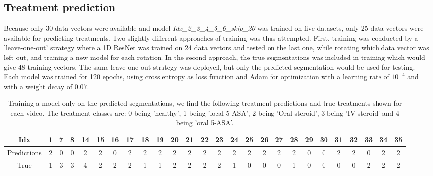 \subsection{Treatment prediction}
Because only 30 data vectors were available and model \textit{Idx\_2\_3\_4\_5\_6\_skip\_20} was trained on five datasets, only 25 data vectors were available for predicting treatments. Two slightly different approaches of training was thus attempted. First, training was conducted by a 'leave-one-out' strategy where a 1D ResNet was trained on 24 data vectors and tested on the last one, while rotating which data vector was left out, and training a new model for each rotation. In the second approach, the true segmentations was included in training which would give 48 training vectors. The same leave-one-out strategy was deployed, but only the predicted segmentation would be used for testing. Each model was trained for 120 epochs, using cross entropy as loss function and Adam for optimization with a learning rate of $10^{-4}$ and with a weight decay of $0.07$. 

\begin{table}[H]
	\hspace{-2.7cm}
	\begin{tabular}{|c|c|c|c|c|c|c|c|c|c|c|c|c|c|c|c|c|c|c|c|c|c|c|c|c|c|}
		\hline
		Idx&1
		&7
		&8
		&14
		&15
		&16
		&17
		&18
		&19
		&20
		&21
		&22
		&23
		&24
		&25
		&26
		&27
		&28
		&29
		&30
		&31
		&32
		&33
		&34
		&35\\\hline\hline
		Predictions&2
		&0
		&0
		&2
		&2
		&0
		&2
		&2
		&2
		&2
		&2
		&2
		&2
		&2
		&2
		&2
		&2
		&2
		&0
		&0
		&2
		&2
		&0
		&2
		&2\\\hline
		True&1
		&3
		&3
		&4
		&2
		&2
		&2
		&1
		&1
		&2
		&2
		&2
		&2
		&1
		&0
		&0
		&0
		&1
		&0
		&0
		&0
		&0
		&2
		&2
		&2\\\hline
	\end{tabular}
	\caption{Training a model only on the predicted segmentations, we find the following treatment predictions and true treatments shown for each video. The treatment classes are: 0 being 'healthy', 1 being 'local 5-ASA', 2 being 'Oral steroid', 3 being 'IV steroid' and 4 being 'oral 5-ASA'.}
	\label{treatmentTable}
\end{table}



